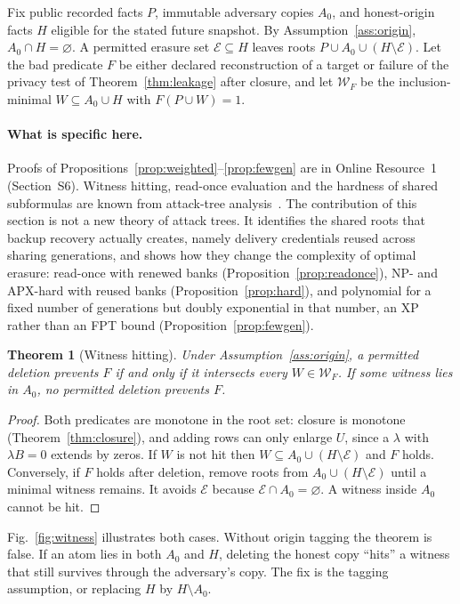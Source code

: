 \documentclass[pdflatex,sn-mathphys-num]{sn-jnl}%
\theoremstyle{plain}
\newtheorem{theorem}{Theorem}
\theoremstyle{definition}
\begin{document}
Fix public recorded facts $P$, immutable adversary copies $A_0$, and honest-origin facts $H$ eligible for the stated future snapshot. By Assumption~\ref{ass:origin}, $A_0\cap H=\varnothing$. A permitted erasure set $\mathcal E\subseteq H$ leaves roots $P\cup A_0\cup(H\setminus\mathcal E)$. Let the bad predicate $F$ be either declared reconstruction of a target or failure of the privacy test of Theorem~\ref{thm:leakage} after closure, and let $\mathcal W_F$ be the inclusion-minimal $W\subseteq A_0\cup H$ with $F(P\cup W)=1$.

\paragraph{What is specific here.}
Proofs of Propositions~\ref{prop:weighted}--\ref{prop:fewgen} are in Online Resource~1 (Section~S6). Witness hitting, read-once evaluation and the hardness of shared subformulas are known from attack-tree analysis~\cite{mauw2005,lopuhaa2022}. The contribution of this section is not a new theory of attack trees. It identifies the shared roots that backup recovery actually creates, namely delivery credentials reused across sharing generations, and shows how they change the complexity of optimal erasure: read-once with renewed banks (Proposition~\ref{prop:readonce}), NP- and APX-hard with reused banks (Proposition~\ref{prop:hard}), and polynomial for a fixed number of generations but doubly exponential in that number, an XP rather than an FPT bound (Proposition~\ref{prop:fewgen}).

\begin{theorem}[Witness hitting]\label{thm:cuts}
Under Assumption~\ref{ass:origin}, a permitted deletion prevents $F$ if and only if it intersects every $W\in\mathcal W_F$. If some witness lies in $A_0$, no permitted deletion prevents $F$.
\end{theorem}
\begin{proof}
Both predicates are monotone in the root set: closure is monotone (Theorem~\ref{thm:closure}), and adding rows can only enlarge $U$, since a $\lambda$ with $\lambda B=0$ extends by zeros. If $W$ is not hit then $W\subseteq A_0\cup(H\setminus\mathcal E)$ and $F$ holds. Conversely, if $F$ holds after deletion, remove roots from $A_0\cup(H\setminus\mathcal E)$ until a minimal witness remains. It avoids $\mathcal E$ because $\mathcal E\cap A_0=\varnothing$. A witness inside $A_0$ cannot be hit.
\end{proof}

Fig.~\ref{fig:witness} illustrates both cases. Without origin tagging the theorem is false. If an atom lies in both $A_0$ and $H$, deleting the honest copy ``hits'' a witness that still survives through the adversary's copy. The fix is the tagging assumption, or replacing $H$ by $H\setminus A_0$.
\end{document}
